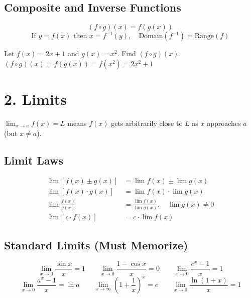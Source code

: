 \documentclass[12pt]{article}
\begin{document}
\subsection{Composite and Inverse Functions}

\begin{formulabox}
\[
  (f \circ g)(x) = f(g(x))
\]
\[
  \text{If } y = f(x) \text{ then } x = f^{-1}(y), \quad \text{Domain}(f^{-1}) = \text{Range}(f)
\]
\end{formulabox}

\begin{examplebox*}
Let $f(x) = 2x+1$ and $g(x) = x^2$. Find $(f \circ g)(x)$.\\[4pt]
$(f \circ g)(x) = f(g(x)) = f(x^2) = 2x^2 + 1$
\end{examplebox*}

\section{2. Limits}

\begin{defbox}[Limit]
$\displaystyle\lim_{x \to a} f(x) = L$ means $f(x)$ gets arbitrarily close to $L$ as $x$ approaches $a$ (but $x \neq a$).
\end{defbox}

\subsection{Limit Laws}

\begin{formulabox}
\begin{align*}
  \lim[f(x) \pm g(x)] &= \lim f(x) \pm \lim g(x) \\[4pt]
  \lim[f(x) \cdot g(x)] &= \lim f(x) \cdot \lim g(x) \\[4pt]
  \lim\frac{f(x)}{g(x)} &= \frac{\lim f(x)}{\lim g(x)}, \quad \lim g(x) \neq 0 \\[4pt]
  \lim[c \cdot f(x)] &= c \cdot \lim f(x)
\end{align*}
\end{formulabox}

\subsection{Standard Limits (Must Memorize)}

\begin{formulabox}
\[
  \lim_{x \to 0}\frac{\sin x}{x} = 1 \qquad
  \lim_{x \to 0}\frac{1-\cos x}{x} = 0 \qquad
  \lim_{x \to 0}\frac{e^x - 1}{x} = 1
\]
\[
  \lim_{x \to 0}\frac{a^x - 1}{x} = \ln a \qquad
  \lim_{x \to \infty}\!\left(1+\frac{1}{x}\right)^{\!x} = e \qquad
  \lim_{x \to 0}\frac{\ln(1+x)}{x} = 1
\]
\end{formulabox}
\end{document}
